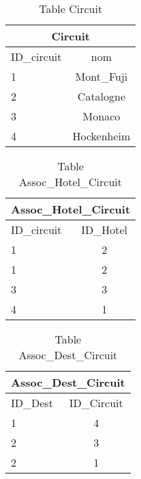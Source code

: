 
\begin{table}[h]
\begin{center}
\begin{tabular}{|l|c|}
\hline
\multicolumn{2}{|c|}{Circuit}\\
\hline
ID\_circuit& nom \\
\hline
1 & Mont\_Fuji\\
\hline
2 & Catalogne\\
\hline
3 & Monaco\\
\hline
4 &  Hockenheim\\
\hline
\end{tabular}
\end{center}
\caption{Table Circuit}
\end{table}


\begin{table}[h]
\begin{center}
\begin{tabular}{|l|c|}
\hline
\multicolumn{2}{|c|}{Assoc\_Hotel\_Circuit}\\
\hline
ID\_circuit& ID\_Hotel \\
\hline
1 & 2\\
\hline
1 & 2\\
\hline
3 & 3\\
\hline
4 & 1 \\
\hline
\end{tabular}
\end{center}
\caption{Table Assoc\_Hotel\_Circuit}
\end{table}
\newpage


\begin{table}[h]
\begin{center}
\begin{tabular}{|l|c|}
\hline
\multicolumn{2}{|c|}{Assoc\_Dest\_Circuit}\\
\hline
ID\_Dest& ID\_Circuit \\
\hline
1 & 4\\
\hline
2 & 3\\
\hline
2 & 1\\
\hline
\end{tabular}
\end{center}
\caption{Table Assoc\_Dest\_Circuit}
\end{table}

